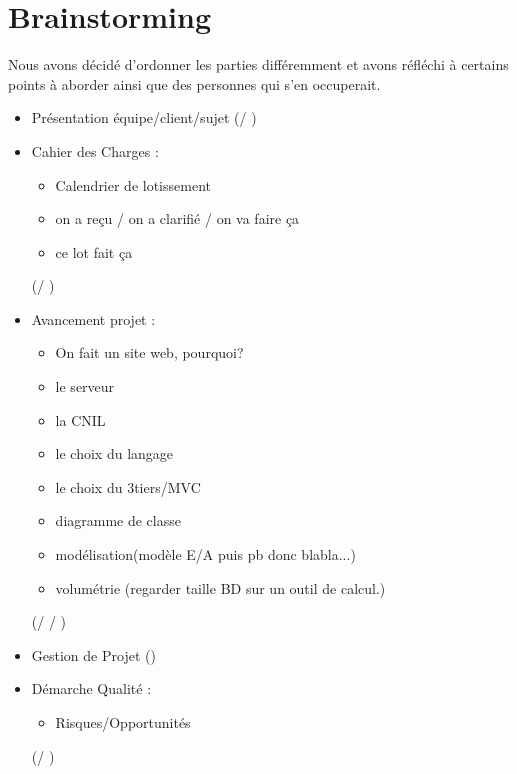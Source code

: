 \documentclass [a4paper] {article}
\begin{document}
\section{Brainstorming}
Nous avons décidé d'ordonner les parties différemment et avons réfléchi à certains points à aborder ainsi que des personnes qui s'en occuperait.
\begin{itemize}
\item Présentation équipe/client/sujet (\Melissa / \Sergi)
\item Cahier des Charges : \begin{itemize} \item Calendrier de lotissement \item on a reçu / on a clarifié / on va faire ça \item ce lot fait ça \end{itemize} (\Mathieu / \Michel)
\item Avancement projet : \begin{itemize} \item On fait un site web, pourquoi? \item le serveur \item la CNIL \item le choix du langage \item le choix du 3tiers/MVC \item diagramme de classe \item modélisation(modèle E/A puis pb donc blabla...) \item volumétrie (regarder taille BD sur un outil de calcul.) \end{itemize} (\Florian / \Matthieu / \Julie)
\item Gestion de Projet (\Sergi)
\item Démarche Qualité : \begin{itemize} \item Risques/Opportunités \end{itemize} (\Pierre / \Kafui)


\end{itemize}


\end{document}
